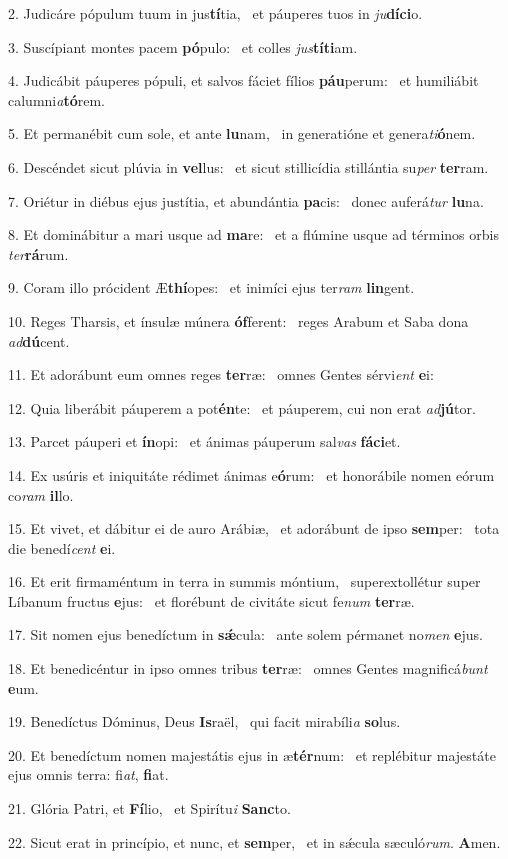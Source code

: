 2. Judicáre pópulum tuum in jus\textbf{tí}tia, \ast\  et páuperes tuos in \textit{ju}\textbf{dí}\textbf{ci}o.\

3. Suscípiant montes pacem \textbf{pó}pulo: \ast\  et colles \textit{jus}\textbf{tí}\textbf{ti}am.\

4. Judicábit páuperes pópuli, et salvos fáciet fílios \textbf{páu}perum: \ast\  et humiliábit calumni\textit{a}\textbf{tó}rem.\

5. Et permanébit cum sole, et ante \textbf{lu}nam, \ast\  in generatióne et genera\textit{ti}\textbf{ó}nem.\

6. Descéndet sicut plúvia in \textbf{vel}lus: \ast\  et sicut stillicídia stillántia su\textit{per} \textbf{ter}ram.\

7. Oriétur in diébus ejus justítia, et abundántia \textbf{pa}cis: \ast\  donec auferá\textit{tur} \textbf{lu}na.\

8. Et dominábitur a mari usque ad \textbf{ma}re: \ast\  et a flúmine usque ad términos orbis \textit{ter}\textbf{rá}rum.\

9. Coram illo prócident Æ\textbf{thí}opes: \ast\  et inimíci ejus ter\textit{ram} \textbf{lin}gent.\

10. Reges Tharsis, et ínsulæ múnera \textbf{óf}ferent: \ast\  reges Arabum et Saba dona \textit{ad}\textbf{dú}cent.\

11. Et adorábunt eum omnes reges \textbf{ter}ræ: \ast\  omnes Gentes sérvi\textit{ent} \textbf{e}i:\

12. Quia liberábit páuperem a pot\textbf{én}te: \ast\  et páuperem, cui non erat \textit{ad}\textbf{jú}tor.\

13. Parcet páuperi et \textbf{ín}opi: \ast\  et ánimas páuperum sal\textit{vas} \textbf{fá}\textbf{ci}et.\

14. Ex usúris et iniquitáte rédimet ánimas e\textbf{ó}rum: \ast\  et honorábile nomen eórum co\textit{ram} \textbf{il}lo.\

15. Et vivet, et dábitur ei de auro Arábiæ, \dag\  et adorábunt de ipso \textbf{sem}per: \ast\  tota die benedí\textit{cent} \textbf{e}i.\

16. Et erit firmaméntum in terra in summis móntium, \dag\  superextollétur super Líbanum fructus \textbf{e}jus: \ast\  et florébunt de civitáte sicut fe\textit{num} \textbf{ter}ræ.\

17. Sit nomen ejus benedíctum in \textbf{sǽ}cula: \ast\  ante solem pérmanet no\textit{men} \textbf{e}jus.\

18. Et benedicéntur in ipso omnes tribus \textbf{ter}ræ: \ast\  omnes Gentes magnificá\textit{bunt} \textbf{e}um.\

19. Benedíctus Dóminus, Deus \textbf{Is}raël, \ast\  qui facit mirabíli\textit{a} \textbf{so}lus.\

20. Et benedíctum nomen majestátis ejus in æ\textbf{tér}num: \ast\  et replébitur majestáte ejus omnis terra: fi\textit{at}, \textbf{fi}at.\

21. Glória Patri, et \textbf{Fí}lio, \ast\  et Spirítu\textit{i} \textbf{Sanc}to.\

22. Sicut erat in princípio, et nunc, et \textbf{sem}per, \ast\  et in sǽcula sæculó\textit{rum}. \textbf{A}men.\

